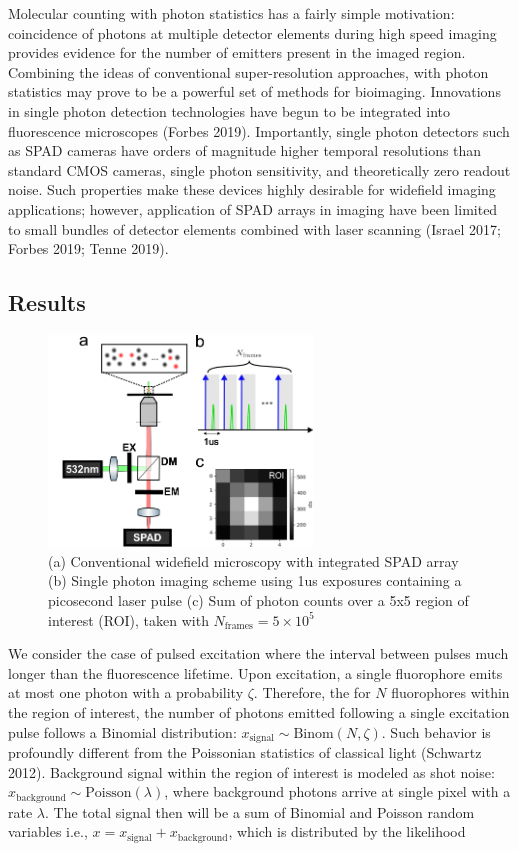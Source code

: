 \documentclass[a4paper, twocolumn, superscriptaddress,prl]{revtex4}  %
\begin{document}
Molecular counting with photon statistics has a fairly simple motivation: coincidence of photons at multiple detector elements during high speed imaging provides evidence for the number of emitters present in the imaged region. Combining the ideas of conventional super-resolution approaches, with photon statistics may prove to be a powerful set of methods for bioimaging. Innovations in single photon detection technologies have begun to be integrated into fluorescence microscopes (Forbes 2019). Importantly, single photon detectors such as SPAD cameras have orders of magnitude higher temporal resolutions than standard CMOS cameras, single photon sensitivity, and theoretically zero readout noise. Such properties make these devices highly desirable for widefield imaging applications; however, application of SPAD arrays in imaging have been limited to small bundles of detector elements combined with laser scanning (Israel 2017; Forbes 2019; Tenne 2019).

\subsection{Results}

\begin{figure}
\includegraphics[width=7cm]{Figure-0.png}
\caption{(a) Conventional widefield microscopy with integrated SPAD array (b) Single photon imaging scheme using 1us exposures containing a picosecond laser pulse (c) Sum of photon counts over a 5x5 region of interest (ROI), taken with $N_{\mathrm{frames}}=5\times 10^{5}$}
\end{figure}    


We consider the case of pulsed excitation where the interval between pulses much longer than the fluorescence lifetime. Upon excitation, a single fluorophore emits at most one photon with a probability $\zeta$. Therefore, the for $N$ fluorophores within the region of interest, the number of photons emitted following a single excitation pulse follows a Binomial distribution: $x_{\mathrm{signal}} \sim \mathrm{Binom}(N,\zeta)$. Such behavior is profoundly different from the Poissonian statistics of classical light (Schwartz 2012). Background signal within the region of interest is modeled as shot noise: $x_{\mathrm{background}} \sim \mathrm{Poisson}(\lambda)$, where background photons arrive at single pixel with a rate $\lambda$. The total signal then will be a sum of Binomial and Poisson random variables i.e., $x = x_{\mathrm{signal}} + x_{\mathrm{background}}$, which is distributed by the likelihood
\end{document}
